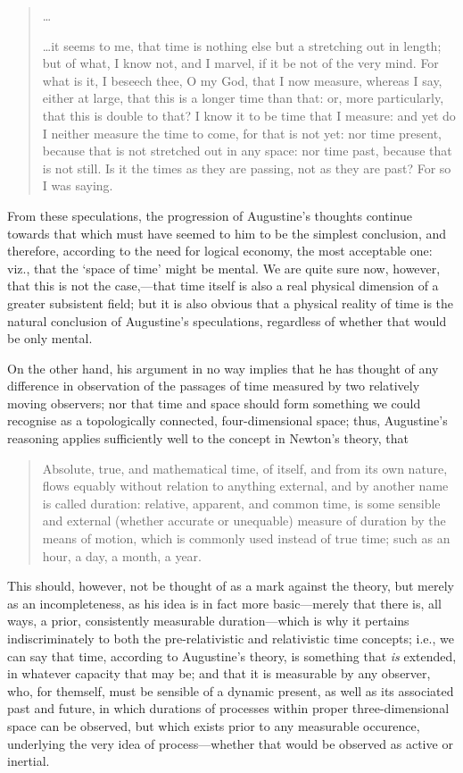 \begin{quotation}
\ldots

\ldots it seems to me, that time is nothing else but a stretching out in length; but of what, I know not, and I marvel, if it be not of the very mind. For what is it, I beseech thee, O my God, that I now measure, whereas I say, either at large, that this is a longer time than that: or, more particularly, that this is double to that? I know it to be time that I measure: and yet do I neither measure the time to come, for that is not yet: nor time present, because that is not stretched out in any space: nor time past, because that is not still. Is it the times as they are passing, not as they are past? For so I was saying.
\end{quotation}

From these speculations, the progression of Augustine's thoughts continue towards that which must have seemed to him to be the simplest conclusion, and therefore, according to the need for logical economy, the most acceptable one: viz., that the `space of time' might be mental. We are quite sure now, however, that this is not the case,---that time itself is also a real physical dimension of a greater subsistent field; but it is also obvious that a physical reality of time is the natural conclusion of Augustine's speculations, regardless of whether that would be only mental. 

On the other hand, his argument in no way implies that he has thought of any difference in observation of the passages of time measured by two relatively moving observers; nor that time and space should form something we could recognise as a topologically connected, four-dimensional space; thus, Augustine's reasoning applies sufficiently well to the concept in Newton's theory, that \cite{Newton1966}
\begin{quote}
Absolute, true, and mathematical time, of itself, and from its own nature, flows equably without relation to anything external, and by another name is called duration: relative, apparent, and common time, is some sensible and external (whether accurate or unequable) measure of duration by the means of motion, which is commonly used instead of true time; such as an hour, a day, a month, a year.
\end{quote} 

This should, however, not be thought of as a mark against the theory, but merely as an incompleteness, as his idea is in fact more basic---merely that there is, all ways, a prior, consistently measurable duration---which is why it pertains indiscriminately to both the pre-relativistic and relativistic time concepts; i.e., we can say that time, according to Augustine's theory, is something that \textit{is} extended, in whatever capacity that may be; and that it is measurable by any observer, who, for themself, must be sensible of a dynamic present, as well as its associated past and future, in which durations of processes within proper three-dimensional space can be observed, but which exists prior to any measurable occurence, underlying the very idea of process---whether that would be observed as active or inertial.

